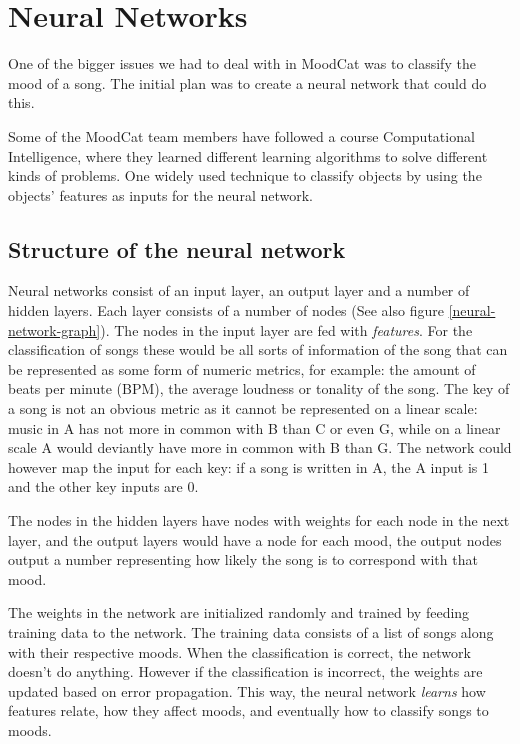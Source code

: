 \chapter{Neural Networks}
\label{appendix-neural-networks}

One of the bigger issues we had to deal with in MoodCat was to classify the mood of a song.
The initial plan was to create a neural network that could do this.

Some of the MoodCat team members have followed a course Computational Intelligence,
where they learned different learning algorithms to solve different kinds of problems.
One widely used technique to classify objects by using the objects' features as inputs for the neural network.

\section{Structure of the neural network}
Neural networks consist of an input layer, an output layer and a number of hidden layers.
Each layer consists of a number of nodes (See also figure \ref{neural-network-graph}).
The nodes in the input layer are fed with \textit{features}.
For the classification of songs these would be all sorts of information of the song that can be represented as some form of numeric metrics, for example: the amount of beats per minute (BPM), the average loudness or tonality of the song.
The key of a song is not an obvious metric as it cannot be represented on a linear scale: music in A has not more in common with B than C or even G, while on a linear scale A would deviantly have more in common with B than G.
The network could however map the input for each key: if a song is written in A, the A input is 1 and the other key inputs are 0.

The nodes in the hidden layers have nodes with weights for each node in the next layer,
and the output layers would have a node for each mood, the output nodes output a number representing how likely the song
is to correspond with that mood.

The weights in the network are initialized randomly and trained by feeding training data to the network.
The training data consists of a list of songs along with their respective moods. When the classification is correct, the network doesn't do anything. However if the classification is incorrect, the weights are updated based on error propagation.
This way, the neural
network \textit{learns} how features relate, how they affect moods, and eventually how to classify songs to moods.

